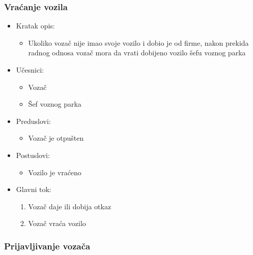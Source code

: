 \subsubsection{\bfseries Vraćanje vozila}
\begin{itemize}
	\item Kratak opis:
		\begin{itemize}
			\item Ukoliko vozač nije imao svoje vozilo i dobio je od firme, nakon prekida radnog odnosa vozač mora da vrati dobijeno vozilo šefu voznog parka
		\end{itemize}

	\item Učesnici:
		\begin{itemize}
		    \item Vozač
		    \item Šef voznog parka
		\end{itemize}


	\item Preduslovi:
		\begin{itemize}
		    \item Vozač je otpušten
		\end{itemize}


	\item Postuslovi:
		\begin{itemize}
			\item Vozilo je vraćeno
	\end{itemize}

	\item Glavni tok:
		\begin{enumerate}
		    \item Vozač daje ili dobija otkaz
		    \item Vozač vraća vozilo
		\end{enumerate}

\end{itemize}
\subsubsection{\bfseries Prijavljivanje vozača}

